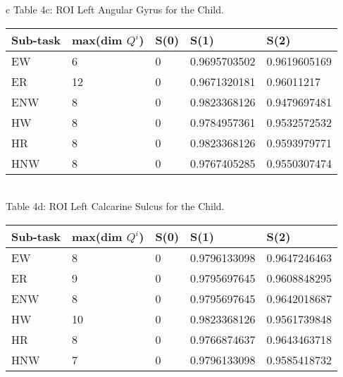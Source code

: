 \documentclass[aps,pre,superscriptaddress,groupedaddress,preprint]{revtex4}  %
\begin{document}
\begin{table*}[!t]
\centering
\begin{tabular}{c}
	Table 4c: ROI Left Angular Gyrus for the Child.\\
	\begin{tabular}{ | p{1.5cm} | C{2.5cm} | C{2.5cm} | C{2.5cm} | C{2.5cm} | }
		\hline
		Sub-task	&	max(dim $Q^{i}$)	&	S(0)	&	S(1)	&	S(2)	\\	\hline
		EW	&	6	&	0	&	0.9695703502	&	0.9619605169	\\	\hline
		ER	&	12	&	0	&	0.9671320181	&	0.96011217	\\	\hline
		ENW	&	8	&	0	&	0.9823368126	&	0.9479697481	\\	\hline
		HW	&	8	&	0	&	0.9784957361	&	0.9532572532	\\	\hline
		HR	&	8	&	0	&	0.9823368126	&	0.9593979771	\\	\hline
		HNW	&	8	&	0	&	0.9767405285	&	0.9550307474	\\	\hline
	\end{tabular}
	\\
	Table 4d: ROI Left Calcarine Sulcus for the Child.\\
	\begin{tabular}{ | p{1.5cm} | C{2.5cm} | C{2.5cm} | C{2.5cm} | C{2.5cm} | }
		\hline
		Sub-task	&	max(dim $Q^{i}$)	&	S(0)	&	S(1)	&	S(2)	\\	\hline
		EW	&	8	&	0	&	0.9796133098	&	0.9647246463	\\	\hline
		ER	&	9	&	0	&	0.9795697645	&	0.9608848295	\\	\hline
		ENW	&	8	&	0	&	0.9795697645	&	0.9642018687	\\	\hline
		HW	&	10	&	0	&	0.9823368126	&	0.9561739848	\\	\hline
		HR	&	8	&	0	&	0.9766874637	&	0.9643463718	\\	\hline
		HNW	&	7	&	0	&	0.9796133098	&	0.9585418732	\\	\hline
	\end{tabular}
\end{tabular}
\end{table*}

% 
\end{document}
